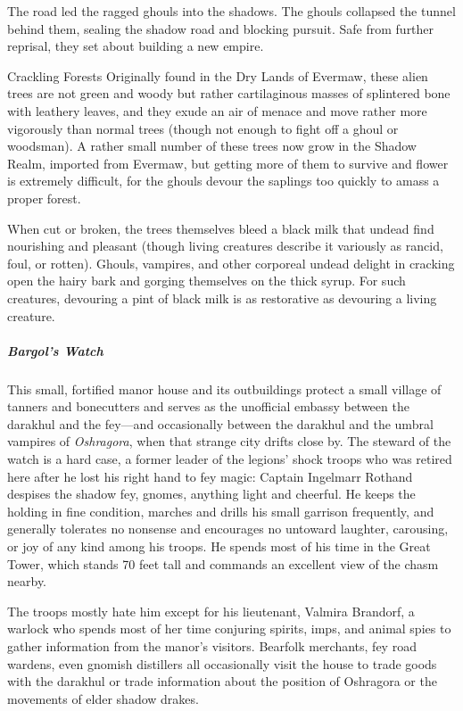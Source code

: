 \documentclass[10pt,a4paper,twoside,bg=print,twocolumn,openany,nodeprecatedcode]{dndbook}
\begin{document}
The road led the ragged ghouls into the shadows. The ghouls collapsed the tunnel behind them, sealing the shadow road and blocking pursuit. Safe from further reprisal, they set about building a new empire.

\begin{DndSidebar}[float=!b]{Crackling Forests}
Originally found in the Dry Lands of Evermaw, these alien trees are not green and woody but rather cartilaginous masses of splintered bone with leathery leaves, and they exude an air of menace and move rather more vigorously than normal trees (though not enough to fight off a ghoul or woodsman). A rather small number of these trees now grow in the Shadow Realm, imported from Evermaw, but getting more of them to survive and flower is extremely difficult, for the ghouls devour the saplings too quickly to amass a proper forest.



When cut or broken, the trees themselves bleed a black milk that undead find nourishing and pleasant (though living creatures describe it variously as rancid, foul, or rotten). Ghouls, vampires, and other corporeal undead delight in cracking open the hairy bark and gorging themselves on the thick syrup. For such creatures, devouring a pint of black milk is as restorative as devouring a living creature.



\end{DndSidebar}

\subparagraph{Bargol's Watch}
This small, fortified manor house and its outbuildings protect a small village of tanners and bonecutters and serves as the unofficial embassy between the darakhul and the fey—and occasionally between the darakhul and the umbral vampires of \textit{Oshragora}, when that strange city drifts close by. The steward of the watch is a hard case, a former leader of the legions' shock troops who was retired here after he lost his right hand to fey magic: Captain Ingelmarr Rothand despises the shadow fey, gnomes, anything light and cheerful. He keeps the holding in fine condition, marches and drills his small garrison frequently, and generally tolerates no nonsense and encourages no untoward laughter, carousing, or joy of any kind among his troops. He spends most of his time in the Great Tower, which stands 70 feet tall and commands an excellent view of the chasm nearby.

The troops mostly hate him except for his lieutenant, Valmira Brandorf, a warlock who spends most of her time conjuring spirits, imps, and animal spies to gather information from the manor's visitors. Bearfolk merchants, fey road wardens, even gnomish distillers all occasionally visit the house to trade goods with the darakhul or trade information about the position of Oshragora or the movements of elder shadow drakes.
\end{document}
